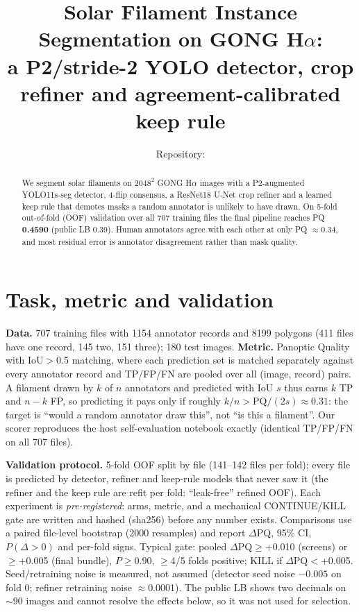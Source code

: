 \documentclass[10pt,twocolumn]{article}
\title{\vspace{-1.2cm}Solar Filament Instance Segmentation on GONG H$\alpha$:\\
a P2/stride-2 YOLO detector, crop refiner and agreement-calibrated keep rule}
\author{\todo{team name / authors} \quad Repository: \todo{public repo URL}}
\date{\vspace{-0.9cm}}
\newcommand{\dpq}{$\Delta$PQ}
\begin{document}
\maketitle

\begin{abstract}
We segment solar filaments on $2048^2$ GONG H$\alpha$ images with a P2-augmented YOLO11s-seg detector,
4-flip consensus, a ResNet18 U-Net crop refiner and a learned keep rule that demotes masks a random
annotator is unlikely to have drawn. On 5-fold out-of-fold (OOF) validation over all 707 training files the
final pipeline reaches PQ \textbf{0.4590} (public LB 0.39). Human annotators agree with each other at only PQ
$\approx$0.34, and most residual error is annotator disagreement rather than mask quality.
\end{abstract}

\section{Task, metric and validation}
\textbf{Data.} 707 training files with 1154 annotator records and 8199 polygons (411 files have one record,
145 two, 151 three); 180 test images. \textbf{Metric.} Panoptic Quality with IoU$>$0.5 matching, where each
prediction set is matched separately against every annotator record and TP/FP/FN are pooled over all
(image, record) pairs. A filament drawn by $k$ of $n$ annotators and predicted with IoU $s$ thus earns
$k$ TP and $n-k$ FP, so predicting it pays only if roughly $k/n > \mathrm{PQ}/(2s)\approx0.31$: the target is
``would a random annotator draw this'', not ``is this a filament''. Our scorer reproduces the host
self-evaluation notebook exactly (identical TP/FP/FN on all 707 files).

\textbf{Validation protocol.} 5-fold OOF split by file (141--142 files per fold); every file is predicted by
detector, refiner and keep-rule models that never saw it (the refiner and the keep rule are refit per fold:
``leak-free'' refined OOF). Each experiment is \emph{pre-registered}: arms, metric, and a mechanical
CONTINUE/KILL gate are written and hashed (sha256) before any number exists. Comparisons use a paired
file-level bootstrap (2000 resamples) and report \dpq, 95\% CI, $P(\Delta>0)$ and per-fold signs. Typical gate:
pooled \dpq$\ge$+0.010 (screens) or $\ge$+0.005 (final bundle), $P\ge0.90$, $\ge$4/5 folds positive; KILL if
\dpq$<$+0.005. Seed/retraining noise is measured, not assumed (detector seed noise $-0.005$ on fold 0;
refiner retraining noise $\approx$0.0001). The public LB shows two decimals on $\sim$90 images and cannot
resolve the effects below, so it was not used for selection.
\end{document}
